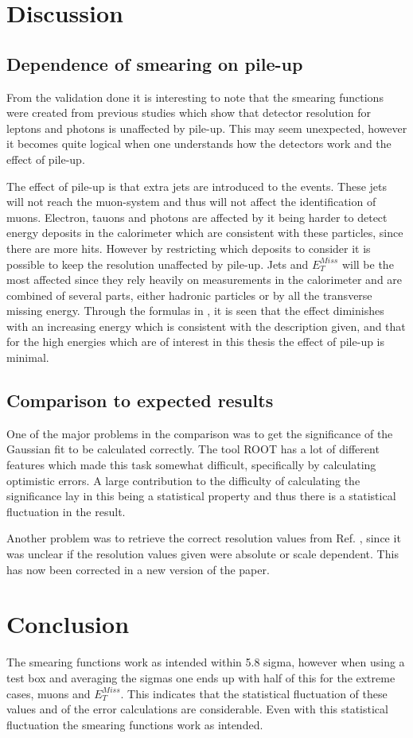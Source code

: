 \newpage
\section{Discussion}\label{chap:vali:sec:dis}
\subsection{Dependence of smearing on pile-up}\label{chap:vali:sec:dis:subsec:smearindep}
From the validation done it is interesting to note that the smearing functions were created from previous studies \citep{Electronperf:2011, ATLAS:LOI2} which show that detector resolution for leptons and photons is unaffected by pile-up. This may seem unexpected, however it becomes quite logical when one understands how the detectors work and the effect of pile-up.

The effect of pile-up is that extra jets are introduced to the events. These jets will not reach the muon-system and thus will not affect the identification of muons. Electron, tauons and photons are affected by it being harder to detect energy deposits in the calorimeter which are consistent with these particles, since there are more hits. However by restricting which deposits to consider it is possible to keep the resolution unaffected by pile-up. Jets and $E_T^{Miss}$ will be the most affected since they rely heavily on measurements in the calorimeter and are combined of several parts, either hadronic particles or by all the transverse missing energy. Through the formulas in , it is seen that the effect diminishes with an increasing energy which is consistent with the description given, and that for the high energies which are of interest in this thesis the effect of pile-up is minimal. 

\subsection{Comparison to expected results}\label{sec:dis:subsec:comp}
One of the major problems in the comparison was to get the significance of the Gaussian fit to be calculated correctly. The tool ROOT has a lot of different features which made this task somewhat difficult, specifically by calculating optimistic errors. A large contribution to the difficulty of calculating the significance lay in this being a statistical property and thus there is a statistical fluctuation in the result. 

Another problem was to retrieve the correct resolution values from Ref. \citep{ATL-PHYS-PUB-2013-004}, since it was unclear if the resolution values given were absolute or scale dependent. This has now been corrected in a new version of the paper.

\section{Conclusion}
The smearing functions work as intended within 5.8 sigma, however when using a test box and averaging the sigmas one ends up with half of this for the extreme cases, muons and $E_T^{Miss}$. This indicates that the statistical fluctuation of these values and of the error calculations are considerable. Even with this statistical fluctuation the smearing functions work as intended.